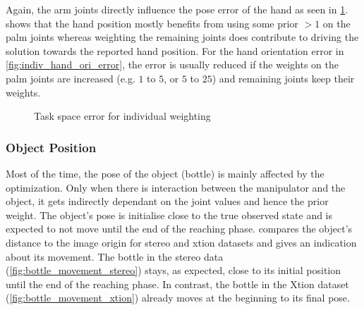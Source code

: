 Again, the arm joints directly influence the pose error of the hand as seen in \cref{fig:indiv_pose_error}.  shows that the hand position mostly benefits from using some prior $>1$ on the palm joints whereas weighting the remaining joints does contribute to driving the solution towards the reported hand position. For the hand orientation error in \cref{fig:indiv_hand_ori_error}, the error is usually reduced if the weights on the palm joints are increased (e.g. $1$ to $5$, or $5$ to $25$) and remaining joints keep their weights.

\begin{figure}
\centering
{}
%

\caption{Task space error for individual weighting}
\label{fig:indiv_pose_error}
\end{figure}

\subsubsection{Object Position}

Most of the time, the pose of the object (bottle) is mainly affected by the optimization. Only when there is interaction between the manipulator and the object, it gets indirectly dependant on the joint values and hence the prior weight. The object's pose is initialise close to the true observed state and is expected to not move until the end of the reaching phase.  compares the object's distance to the image origin for stereo and xtion datasets and gives an indication about its movement. The bottle in the stereo data (\cref{fig:bottle_movement_stereo}) stays, as expected, close to its initial position until the end of the reaching phase. In contrast, the bottle in the Xtion dataset (\cref{fig:bottle_movement_xtion}) already moves at the beginning to its final pose.

